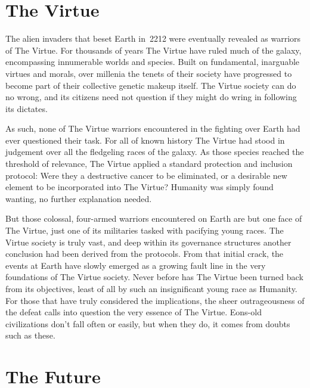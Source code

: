 \documentclass{novanarrative}
\begin{document}
\section{The Virtue}

The alien invaders that beset Earth in~2212 were eventually revealed
as warriors of The Virtue.  For thousands of years The Virtue have
ruled much of the galaxy, encompassing innumerable worlds and species.
Built on fundamental, inarguable virtues and morals, over millenia the
tenets of their society have progressed to become part of their
collective genetic makeup itself.  The Virtue society can do no wrong,
and its citizens need not question if they might do wring in following
its dictates.

As such, none of The Virtue warriors encountered in the fighting over
Earth had ever questioned their task.  For all of known history The
Virtue had stood in judgement over all the fledgeling races of the
galaxy.  As those species reached the threshold of relevance, The
Virtue applied a standard protection and inclusion protocol: Were they
a destructive cancer to be eliminated, or a desirable new element to
be incorporated into The Virtue?  Humanity was simply found wanting,
no further explanation needed.

But those colossal, four-armed warriors encountered on Earth are but
one face of The Virtue, just one of its militaries tasked with
pacifying young races.  The Virtue society is truly vast, and deep
within its governance structures another conclusion had been derived
from the protocols.  From that initial crack, the events at Earth have
slowly emerged as a growing fault line in the very foundations of The
Virtue society.  Never before has The Virtue been turned back from its
objectives, least of all by such an insignificant young race as
Humanity.  For those that have truly considered the implications, the
sheer outrageousness of the defeat calls into question the very
essence of The Virtue.  Eons-old civilizations don't fall often or
easily, but when they do, it comes from doubts such as these.

\section{The Future}

\clearpage
\squelchbackground

\pagebreak
\restorebackground

\end{document}
